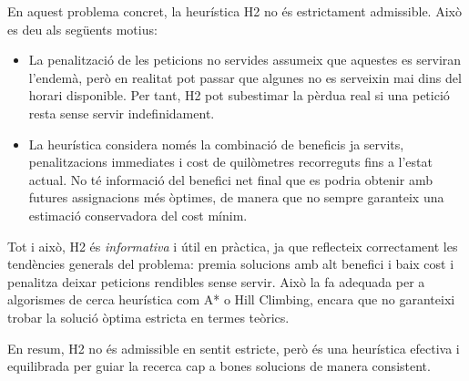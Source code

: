 En aquest problema concret, la heurística H2 no és estrictament admissible. Això es deu als següents motius:

\begin{itemize}
\item La penalització de les peticions no servides assumeix que aquestes es serviran l’endemà, però en realitat pot passar que algunes no es serveixin mai dins del horari disponible. Per tant, H2 pot subestimar la pèrdua real si una petició resta sense servir indefinidament.
\item La heurística considera només la combinació de beneficis ja servits, penalitzacions immediates i cost de quilòmetres recorreguts fins a l’estat actual. No té informació del benefici net final que es podria obtenir amb futures assignacions més òptimes, de manera que no sempre garanteix una estimació conservadora del cost mínim.
\end{itemize}

Tot i això, H2 és \textit{informativa} i útil en pràctica, ja que reflecteix correctament les tendències generals del problema: premia solucions amb alt benefici i baix cost i penalitza deixar peticions rendibles sense servir. Això la fa adequada per a algorismes de cerca heurística com A* o Hill Climbing, encara que no garanteixi trobar la solució òptima estricta en termes teòrics.

En resum, H2 no és admissible en sentit estricte, però és una heurística efectiva i equilibrada per guiar la recerca cap a bones solucions de manera consistent.